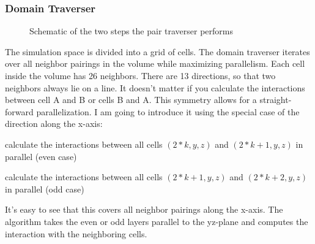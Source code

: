 \subsubsection{Domain Traverser}
\begin{figure}
  \centering
  \caption{Schematic of the two steps the pair traverser performs}
\end{figure}
The simulation space is divided into a grid of cells.  The domain traverser iterates over all neighbor pairings in the volume while maximizing parallelism. Each cell inside the volume has 26 neighbors. There are 13 directions, so that two neighbors always lie on a line. It doesn't matter if you calculate the interactions between cell A and B or cells B and A. This symmetry allows for a straight-forward parallelization.
I am going to introduce it using the special case of the direction along the x-axis:
\begin{compactenum}
\item calculate the interactions between all cells $ \left ( 2*k, y, z \right ) $ and $ \left ( 2*k + 1, y, z \right ) $ in parallel (even case)
\item calculate the interactions between all cells $ \left ( 2*k + 1, y, z \right ) $ and $ \left ( 2*k + 2, y, z \right ) $ in parallel (odd case)
\end{compactenum}
It's easy to see that this covers all neighbor pairings along the x-axis. 
The algorithm takes the even or odd layers parallel to the yz-plane and computes the interaction with the neighboring cells.

